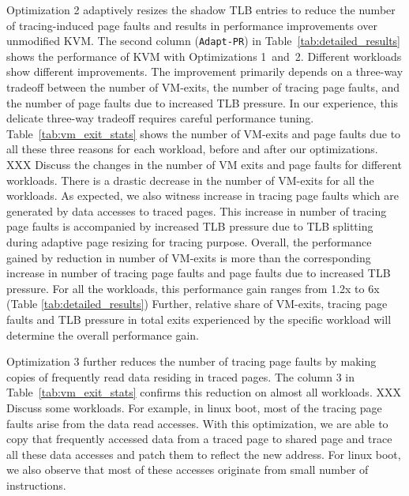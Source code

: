\documentclass[10pt,twocolumn]{article}
\begin{document}
Optimization 2 adaptively resizes the shadow TLB entries to reduce
the number of tracing-induced page faults and results in
performance improvements over unmodified KVM. The second column ({\tt Adapt-PR})
in Table~\ref{tab:detailed_results} shows the performance of KVM with
Optimizations 1~and~2.
Different workloads show different improvements. The improvement primarily depends
on a three-way tradeoff between the number of VM-exits, the number of
tracing page faults, and the number of page faults due to increased TLB pressure.
In our experience, this delicate three-way tradeoff requires careful
performance tuning.
Table~\ref{tab:vm_exit_stats} shows the number of VM-exits and page faults due
to all these three reasons for each workload, before and after our optimizations.
XXX Discuss the changes in the number
of VM exits and page faults for different workloads.
There is a drastic decrease in the number of VM-exits for all the workloads. 
As expected, we also witness increase in tracing page faults which are generated 
by data accesses to traced pages.
 This increase in number of tracing page faults is accompanied by increased TLB pressure
 due to TLB splitting during adaptive page resizing for tracing purpose.
 Overall, the performance gained by reduction in number of VM-exits is more than the corresponding increase in number of tracing page faults and page faults due to increased TLB pressure.
  For all the workloads, this performance gain ranges from 1.2x to 6x (Table \ref{tab:detailed_results})
  Further, relative share of VM-exits, tracing page faults and TLB pressure in total
   exits experienced by the specific workload will determine the overall performance gain.

   

Optimization 3 further reduces the number of tracing page faults by
making copies of frequently read data residing in traced pages. The column 3 in
Table~\ref{tab:vm_exit_stats} confirms this reduction on almost all workloads.
XXX Discuss some workloads. 
For example, in linux boot, most of the tracing page faults arise from the data read 
accesses. With this optimization, we are able to copy that frequently accessed data from
 a traced page to shared page and trace all these data accesses and patch them to reflect
 the new address.
For linux boot, we also observe that most of these accesses originate from small number of instructions. 
\end{document}
